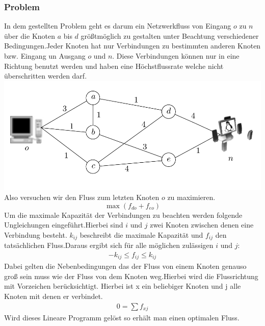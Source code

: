 \subsubsection{Problem}
	In dem gestellten Problem geht es darum ein Netzwerkfluss von Eingang $o$ zu $n$ über die Knoten $a$ bis $d$ größtmöglich zu gestalten unter Beachtung verschiedener Bedingungen.Jeder Knoten hat nur Verbindungen zu bestimmten anderen Knoten bzw. Eingang un Ausgang $o$ und $n$. Diese Verbindungen können nur in eine Richtung benutzt werden und haben eine Höchstflussrate welche nicht überschritten werden darf. 
	\includegraphics[width=\textwidth]{Grafiken/Netzwerkfluss_Bild.png}
	Also versuchen wir den Fluss zum letzten Knoten $o$ zu maximieren.
	\[ \max(f_{do}+f_{eo}) \]
	Um die maximale Kapazität der Verbindungen zu beachten werden folgende Ungleichungen eingeführt.Hierbei sind $i$ und $j$ zwei Knoten zwischen denen eine Verbindung besteht. $k_{ij}$ beschreibt die maximale Kapazität und $f_{ij}$ den tatsächlichen Fluss.Daraus ergibt sich für alle möglichen zulässigen $i$ und $j$:  
	\begin{align*}
		-k_{ij} \leq f_{ij} \leq k_{ij}
	\end{align*}
	Dabei gelten die Nebenbedingungen das der Fluss von einem Knoten genauso groß sein muss wie der Fluss von dem Knoten weg.Hierbei wird die Flussrichtung mit Vorzeichen berücksichtigt. Hierbei ist x ein beliebiger Knoten und j alle Knoten mit denen er verbindet.
	\begin{align*}
	0=\sum{f_{xj}}
	\end{align*}
	Wird dieses Lineare Programm gelöst so erhält man einen optimalen Fluss. 
	
	
	
	
